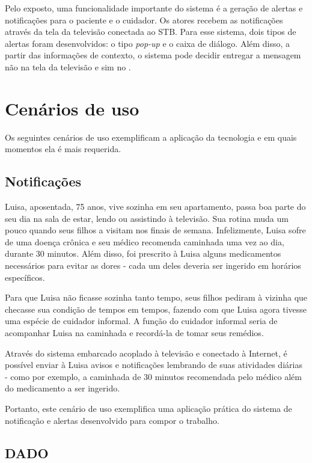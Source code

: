 Pelo exposto, uma funcionalidade importante do sistema é a geração de alertas e
notificações para o paciente e o cuidador. Os atores recebem as notificações
através da tela da televisão conectada ao STB. Para esse sistema, dois tipos de
alertas foram desenvolvidos: o tipo \textit{pop-up} e o caixa de diálogo.
Além disso, a partir das informações de contexto, o sistema pode decidir
entregar a mensagem não na tela da televisão e sim no \smartphone.

\section{Cenários de uso} \label{sec:cenarios-de-uso}

Os seguintes cenários de uso exemplificam a aplicação da tecnologia e em quais
momentos ela é mais requerida.

\subsection{Notificações}\label{subsec:notificacoes}

Luisa, aposentada, 75 anos, vive sozinha em seu apartamento, passa boa parte do
seu dia na sala de estar, lendo ou assistindo à televisão. Sua rotina muda um
pouco quando seus filhos a visitam nos finais de semana. Infelizmente, Luisa
sofre de uma doença crônica e seu médico recomenda caminhada uma vez ao dia,
durante 30 minutos. Além disso, foi prescrito à Luisa alguns medicamentos
necessários para evitar as dores - cada um deles deveria ser ingerido em
horários específicos.

Para que Luisa não ficasse sozinha tanto tempo, seus filhos pediram à vizinha
que checasse sua condição de tempos em tempos, fazendo com que Luisa agora tivesse uma
espécie de cuidador informal. A função do cuidador informal seria de acompanhar
Luisa na caminhada e recordá-la de tomar seus remédios.

Através do sistema embarcado acoplado à televisão e conectado à Internet, é
possível enviar à Luisa avisos e notificações lembrando de suas atividades
diárias - como por exemplo, a caminhada de 30 minutos recomendada pelo
médico além do medicamento a ser ingerido.

Portanto, este cenário de uso exemplifica uma aplicação prática do sistema de
notificação e alertas desenvolvido para compor o trabalho.

\subsection{DADO}\label{subsec:dado}

